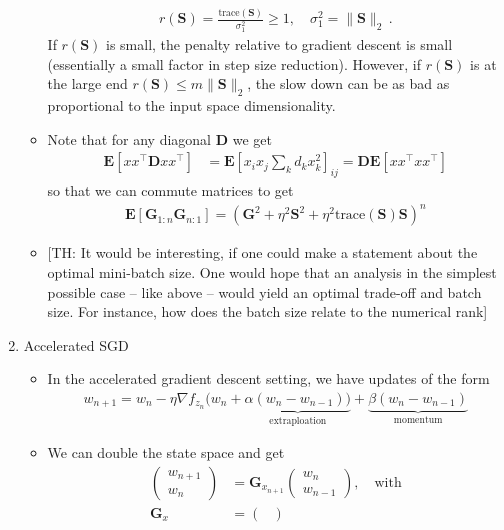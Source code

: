\documentclass{article}
\newcommand{\E}{{\mathbf E}}
\newcommand{\mD}{{\mathbf D}}
\newcommand{\mS}{{\mathbf S}}
\newcommand{\mG}{{\mathbf G}}
\begin{document}
\begin{enumerate}
\begin{itemize}
\begin{align}
r(\mS) = \frac{\text{trace}(\mS)}{\sigma_1^2} \geq 1, \quad \sigma_1^2 = \| \mS\|_2\,.
\end{align}
If $r(\mS)$ is small, the penalty relative to gradient descent is small (essentially a small factor in step size reduction). However, if $r(\mS)$ is at the large end $r(\mS) \le m \| \mS\|_2$, the slow down can be as bad as proportional to the input space dimensionality. 
\item Note that for any diagonal $\mD$ we get 
\begin{align}
\E[xx^\top \mD xx^\top] & = \E\left[ x_i x_j  \sum_{k} d_k x^2_k  \right]_{ij} 
= \mD\E\left[ xx^\top xx^\top \right]
\end{align}
so that we can commute matrices to get
\begin{align}
\E[\mG_{1:n} \mG_{n:1}] =( \mG^2 + \eta^2 \mS^2  + \eta^2 \text{trace}(\mS) \mS)^n
\end{align}
\item {[TH: It would be interesting, if one could make a statement about the optimal mini-batch size. One would hope that an analysis in the simplest possible case -- like above -- would yield an optimal trade-off and batch size. For instance, how does the batch size relate to the numerical rank]}
\end{itemize}
\item Accelerated SGD
\begin{itemize}
\item In the accelerated gradient descent setting, we have updates of the form 
\begin{align}
w_{n+1} = w_n -  \eta \nabla f_{z_n}(w_n  + \underbrace{\alpha (w_n - w_{n-1}))}_{\text{extraploation}} + \underbrace{\beta (w_n - w_{n-1})}_{\text{momentum}}
\end{align}
\item We can double the state space and get 
\begin{align}
\begin{pmatrix}  w_{n+1} \\ w_n \end{pmatrix} & = \mG_{x_{n+1}} \begin{pmatrix} w_{n} \\ w_{n-1} \end{pmatrix}, \quad \text{with} \\
\mG_x & = 
\begin{pmatrix} 

\end{pmatrix}
\end{align}
\end{itemize}
\end{enumerate}
\end{document}

